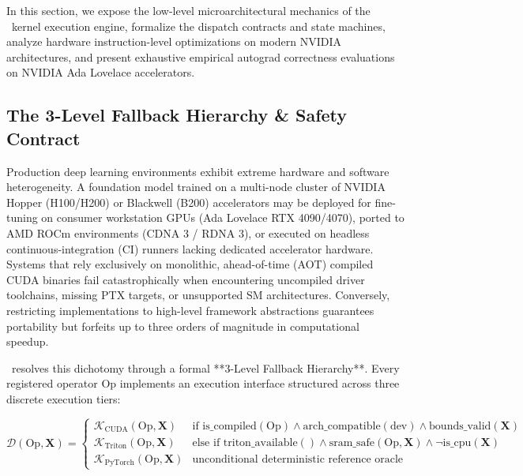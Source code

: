In this section, we expose the low-level microarchitectural mechanics of the \neuralops\ kernel execution engine, formalize the dispatch contracts and state machines, analyze hardware instruction-level optimizations on modern NVIDIA architectures, and present exhaustive empirical autograd correctness evaluations on NVIDIA Ada Lovelace accelerators.

\subsection{The 3-Level Fallback Hierarchy \& Safety Contract}
\label{subsec:fallback_hierarchy}

Production deep learning environments exhibit extreme hardware and software heterogeneity. A foundation model trained on a multi-node cluster of NVIDIA Hopper (H100/H200) or Blackwell (B200) accelerators may be deployed for fine-tuning on consumer workstation GPUs (Ada Lovelace RTX 4090/4070), ported to AMD ROCm environments (CDNA 3 / RDNA 3), or executed on headless continuous-integration (CI) runners lacking dedicated accelerator hardware. Systems that rely exclusively on monolithic, ahead-of-time (AOT) compiled CUDA binaries fail catastrophically when encountering uncompiled driver toolchains, missing PTX targets, or unsupported SM architectures. Conversely, restricting implementations to high-level framework abstractions guarantees portability but forfeits up to three orders of magnitude in computational speedup.

\neuralops\ resolves this dichotomy through a formal **3-Level Fallback Hierarchy**. Every registered operator $\text{Op}$ implements an execution interface structured across three discrete execution tiers:

\begin{equation}
\label{eq:formal_dispatch_rule}
\mathcal{D}(\text{Op}, \mathbf{X}) = \begin{cases} 
\mathcal{K}_{\text{CUDA}}(\text{Op}, \mathbf{X}) & \text{if } \text{is\_compiled}(\text{Op}) \land \text{arch\_compatible}(\text{dev}) \land \text{bounds\_valid}(\mathbf{X}) \\
\mathcal{K}_{\text{Triton}}(\text{Op}, \mathbf{X}) & \text{else if } \text{triton\_available}() \land \text{sram\_safe}(\text{Op}, \mathbf{X}) \land \neg \text{is\_cpu}(\mathbf{X}) \\
\mathcal{K}_{\text{PyTorch}}(\text{Op}, \mathbf{X}) & \text{unconditional deterministic reference oracle}
\end{cases}
\end{equation}

